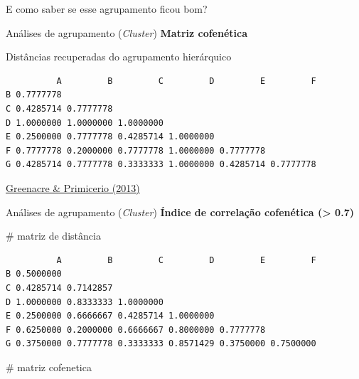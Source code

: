 \documentclass[
  ignorenonframetext,
]{beamer}
\newenvironment{Shaded}{\begin{snugshade}}{\end{snugshade}}
\newcommand{\CommentTok}[1]{\textcolor[rgb]{0.37,0.37,0.37}{#1}}
\begin{document}
\begin{frame}[fragile]{E como saber se esse agrupamento ficou bom?}
\protect\hypertarget{e-como-saber-se-esse-agrupamento-ficou-bom}{}
\begin{block}{Análises de agrupamento (\emph{Cluster})}
\protect\hypertarget{anuxe1lises-de-agrupamento-cluster-11}{}
\textbf{Matriz cofenética}

Distâncias recuperadas do agrupamento hierárquico

\begin{verbatim}
          A         B         C         D         E         F
B 0.7777778                                                  
C 0.4285714 0.7777778                                        
D 1.0000000 1.0000000 1.0000000                              
E 0.2500000 0.7777778 0.4285714 1.0000000                    
F 0.7777778 0.2000000 0.7777778 1.0000000 0.7777778          
G 0.4285714 0.7777778 0.3333333 1.0000000 0.4285714 0.7777778
\end{verbatim}

\href{https://www.fbbva.es/microsite/multivariate-statistics/}{Greenacre
\& Primicerio (2013)}
\end{block}

\begin{block}{Análises de agrupamento (\emph{Cluster})}
\protect\hypertarget{anuxe1lises-de-agrupamento-cluster-12}{}
\textbf{Índice de correlação cofenética (\textgreater{} 0.7)}

\begin{Shaded}
\begin{Highlighting}[]
\CommentTok{\# matriz de distância }
\end{Highlighting}
\end{Shaded}

\begin{verbatim}
          A         B         C         D         E         F
B 0.5000000                                                  
C 0.4285714 0.7142857                                        
D 1.0000000 0.8333333 1.0000000                              
E 0.2500000 0.6666667 0.4285714 1.0000000                    
F 0.6250000 0.2000000 0.6666667 0.8000000 0.7777778          
G 0.3750000 0.7777778 0.3333333 0.8571429 0.3750000 0.7500000
\end{verbatim}

\begin{Shaded}
\begin{Highlighting}[]
\CommentTok{\# matriz cofenetica}
\end{Highlighting}
\end{Shaded}


\end{block}
\end{frame}
\end{document}
